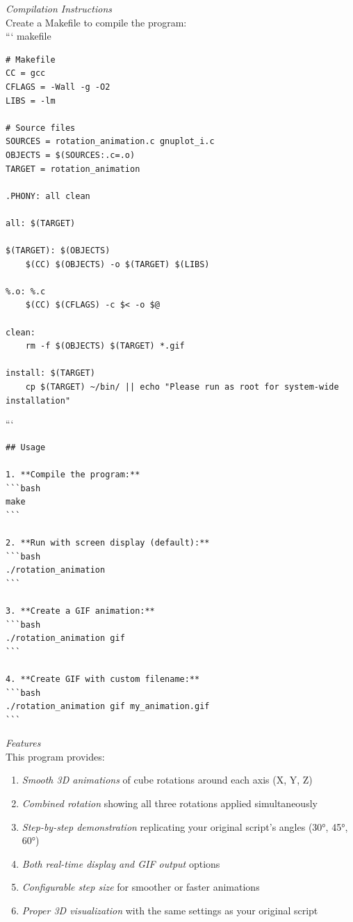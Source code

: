 \documentclass[a4paper,10pt]{article}
\begin{document}
\emph{Compilation Instructions}\\
Create a Makefile to compile the program:\\
``` makefile
\begin{verbatim}
# Makefile
CC = gcc
CFLAGS = -Wall -g -O2
LIBS = -lm

# Source files
SOURCES = rotation_animation.c gnuplot_i.c
OBJECTS = $(SOURCES:.c=.o)
TARGET = rotation_animation

.PHONY: all clean

all: $(TARGET)

$(TARGET): $(OBJECTS)
	$(CC) $(OBJECTS) -o $(TARGET) $(LIBS)

%.o: %.c
	$(CC) $(CFLAGS) -c $< -o $@

clean:
	rm -f $(OBJECTS) $(TARGET) *.gif

install: $(TARGET)
	cp $(TARGET) ~/bin/ || echo "Please run as root for system-wide installation"	                                                                                      \end{verbatim}
```\\
\begin{verbatim}
## Usage

1. **Compile the program:**
```bash
make
```

2. **Run with screen display (default):**
```bash
./rotation_animation
```

3. **Create a GIF animation:**
```bash
./rotation_animation gif
```

4. **Create GIF with custom filename:**
```bash
./rotation_animation gif my_animation.gif
```
\end{verbatim}
\emph{Features}\\
This program provides:
\begin{enumerate}
\item \emph{Smooth 3D animations} of cube rotations around each axis (X, Y, Z)
\item \emph{Combined rotation} showing all three rotations applied simultaneously
\item \emph{Step-by-step demonstration} replicating your original script's angles (30°, 45°, 60°)
\item \emph{Both real-time display and GIF output} options
\item \emph{Configurable step size} for smoother or faster animations
\item \emph{Proper 3D visualization} with the same settings as your original script
\end{enumerate}
\end{document}

